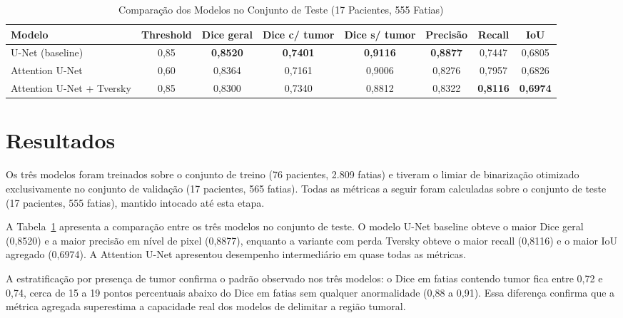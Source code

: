 \documentclass[conference]{IEEEtran}
\begin{document}
\begin{table}[t]
\centering
\small
\setlength{\tabcolsep}{6pt}
\caption{Comparação dos Modelos no Conjunto de Teste (17 Pacientes, 555 Fatias)}
\label{tab:model_comparison}
\begin{tabular}{l c c c c c c c}
\hline
\textbf{Modelo} & \textbf{Threshold} & \textbf{Dice geral} & \textbf{Dice c/ tumor} & \textbf{Dice s/ tumor} & \textbf{Precisão} & \textbf{Recall} & \textbf{IoU} \\
\hline
U-Net (baseline)          & 0,85 & \textbf{0,8520} & \textbf{0,7401} & \textbf{0,9116} & \textbf{0,8877} & 0,7447 & 0,6805 \\
Attention U-Net           & 0,60 & 0,8364          & 0,7161          & 0,9006          & 0,8276          & 0,7957 & 0,6826 \\
Attention U-Net + Tversky & 0,85 & 0,8300          & 0,7340          & 0,8812          & 0,8322          & \textbf{0,8116} & \textbf{0,6974} \\
\hline
\end{tabular}
\end{table}

\section{Resultados}
\label{sec:resultados}
Os três modelos foram treinados sobre o conjunto de treino (76 pacientes, 2.809 fatias) e tiveram o limiar de binarização otimizado exclusivamente no conjunto de validação (17 pacientes, 565 fatias). Todas as métricas a seguir foram calculadas sobre o conjunto de teste (17 pacientes, 555 fatias), mantido intocado até esta etapa.

A Tabela~\ref{tab:model_comparison} apresenta a comparação entre os três modelos no conjunto de teste. O modelo U-Net baseline obteve o maior Dice geral (0,8520) e a maior precisão em nível de pixel (0,8877), enquanto a variante com perda Tversky obteve o maior recall (0,8116) e o maior IoU agregado (0,6974). A Attention U-Net apresentou desempenho intermediário em quase todas as métricas.

A estratificação por presença de tumor confirma o padrão observado nos três modelos: o Dice em fatias contendo tumor fica entre 0,72 e 0,74, cerca de 15 a 19 pontos percentuais abaixo do Dice em fatias sem qualquer anormalidade (0,88 a 0,91). Essa diferença confirma que a métrica agregada superestima a capacidade real dos modelos de delimitar a região tumoral.
\end{document}
